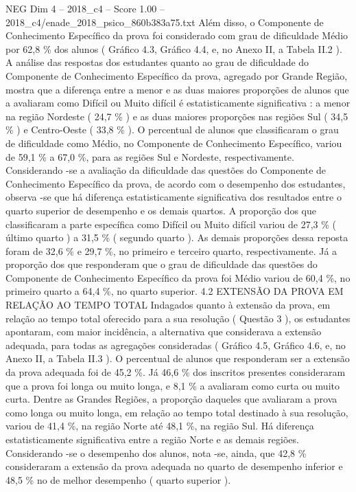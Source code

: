 \begin{textsample}{NEG Dim 4 – 2018\_c4 – Score 1.00 – 2018\_c4/enade\_2018\_psico\_860b383a75.txt}
Além disso, o Componente de Conhecimento Específico da prova foi considerado com grau de dificuldade Médio por 62,8 \% dos alunos ( Gráfico 4.3, Gráfico 4.4, e, no Anexo II, a Tabela II.2 ).
A análise das respostas dos estudantes quanto ao grau de dificuldade do Componente de Conhecimento Específico da prova, agregado por Grande Região, mostra que a diferença entre a menor e as duas maiores proporções de alunos que a avaliaram como Difícil ou Muito difícil é estatisticamente significativa : a menor na região Nordeste ( 24,7 \% ) e as duas maiores proporções nas regiões Sul ( 34,5 \% ) e Centro-Oeste ( 33,8 \% ).
O percentual de alunos que classificaram o grau de dificuldade como Médio, no Componente de Conhecimento Específico, variou de 59,1 \% a 67,0 \%, para as regiões Sul e Nordeste, respectivamente.
Considerando -se a avaliação da dificuldade das questões do Componente de Conhecimento Específico da prova, de acordo com o desempenho dos estudantes, observa -se que há diferença estatisticamente significativa dos resultados entre o quarto superior de desempenho e os demais quartos.
A proporção dos que classificaram a parte específica como Difícil ou Muito difícil variou de 27,3 \% ( último quarto ) a 31,5 \% ( segundo quarto ).
As demais proporções dessa reposta foram de 32,6 \% e 29,7 \%, no primeiro e terceiro quarto, respectivamente.
Já a proporção dos que responderam que o grau de dificuldade das questões do Componente de Conhecimento Específico da prova foi Médio variou de 60,4 \%, no primeiro quarto a 64,4 \%, no quarto superior. 4.2 EXTENSÃO DA PROVA EM RELAÇÃO AO TEMPO TOTAL Indagados quanto à extensão da prova, em relação ao tempo total oferecido para a sua resolução ( Questão 3 ), os estudantes apontaram, com maior incidência, a alternativa que considerava a extensão adequada, para todas as agregações consideradas ( Gráfico 4.5, Gráfico 4.6, e, no Anexo II, a Tabela II.3 ).
O percentual de alunos que responderam ser a extensão da prova adequada foi de 45,2 \%.
Já 46,6 \% dos inscritos presentes consideraram que a prova foi longa ou muito longa, e 8,1 \% a avaliaram como curta ou muito curta.
Dentre as Grandes Regiões, a proporção daqueles que avaliaram a prova como longa ou muito longa, em relação ao tempo total destinado à sua resolução, variou de 41,4 \%, na região Norte até 48,1 \%, na região Sul.
Há diferença estatisticamente significativa entre a região Norte e as demais regiões.
Considerando -se o desempenho dos alunos, nota -se, ainda, que 42,8 \% consideraram a extensão da prova adequada no quarto de desempenho inferior e 48,5 \% no de melhor desempenho ( quarto superior ).

\end{textsample}
